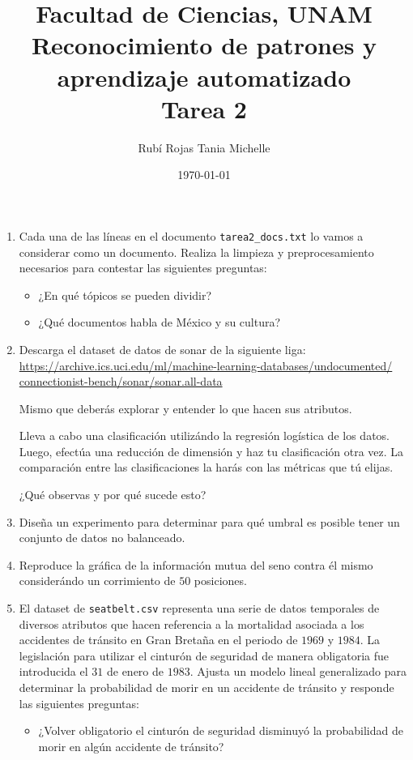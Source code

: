 \documentclass[letterpaper,11pt]{article}
\title{Facultad de Ciencias, UNAM \\ 
       Reconocimiento de patrones y aprendizaje automatizado \\ 
       Tarea 2}
\author{Rubí Rojas Tania Michelle}
\date{\today}
\begin{document}
\maketitle

\begin{enumerate}
    \item Cada una de las líneas en el documento \texttt{tarea2\_docs.txt} lo 
    vamos a considerar como un documento. Realiza la limpieza y preprocesamiento 
    necesarios para contestar las siguientes preguntas:
    \begin{itemize}
        \item ¿En qué tópicos se pueden dividir?

        \item ¿Qué documentos habla de México y su cultura?
    \end{itemize}

    \item Descarga el dataset de datos de sonar de la siguiente liga:
    \url{https://archive.ics.uci.edu/ml/machine-learning-databases/undocumented/
    connectionist-bench/sonar/sonar.all-data}

    Mismo que deberás explorar y entender lo que hacen sus atributos. 
    
    Lleva a cabo una clasificación utilizándo la regresión logística de los 
    datos. Luego, efectúa una reducción de dimensión y haz tu clasificación 
    otra vez. La comparación entre las clasificaciones la harás con las 
    métricas que tú elijas. 

    ¿Qué observas y por qué sucede esto?

    \item Diseña un experimento para determinar para qué umbral es posible tener 
    un conjunto de datos no balanceado.

    \item Reproduce la gráfica de la información mutua del seno contra él mismo 
    considerándo un corrimiento de $50$ posiciones.

    \item El dataset de \texttt{seatbelt.csv} representa una serie de datos 
    temporales de diversos atributos que hacen referencia a la mortalidad 
    asociada a los accidentes de tránsito en Gran Bretaña en el periodo de 
    $1969$ y $1984$. La legislación para utilizar el cinturón de seguridad de 
    manera obligatoria fue introducida el $31$ de enero de $1983$. Ajusta un 
    modelo lineal generalizado para determinar la probabilidad de morir en 
    un accidente de tránsito y responde las siguientes preguntas:
    \begin{itemize}
        \item ¿Volver obligatorio el cinturón de seguridad disminuyó la 
        probabilidad de morir en algún accidente de tránsito?


\end{itemize}
\end{enumerate}
\end{document}
